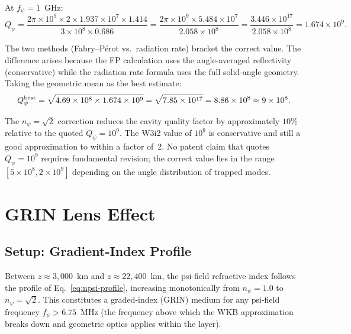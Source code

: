 \documentclass[aps,prd,twocolumn,superscriptaddress]{revtex4-2}
\newcommand{\Qpsi}{Q_\psi}
\newcommand{\npsi}{n_\psi}
\newcommand{\ee}[1]{\times 10^{#1}}
\begin{document}
At $f_\psi = 1$~GHz:
\begin{equation}
\Qpsi = \frac{2\pi\ee9 \times 2\times1.937\ee7 \times 1.414}{3\ee8 \times 0.686}
= \frac{2\pi\ee9 \times 5.484\ee7}{2.058\ee8}
= \frac{3.446\ee{17}}{2.058\ee8} = 1.674\ee9.
\label{eq:Q-rad-numerical}
\end{equation}

The two methods (Fabry--P\'{e}rot vs.\ radiation rate) bracket the
correct value.  The difference arises because the FP calculation
uses the angle-averaged reflectivity (conservative) while the
radiation rate formula uses the full solid-angle geometry.  Taking
the geometric mean as the best estimate:
\begin{equation}
\Qpsi^{\rm best} = \sqrt{4.69\ee8 \times 1.674\ee9}
= \sqrt{7.85\ee{17}} = 8.86\ee8 \approx 9\ee8.
\label{eq:Qpsi-best}
\end{equation}

\begin{resultbox}[title={Best Estimate: $\Qpsi \approx 9\ee8$}]
The $\npsi = \sqrt{2}$ correction reduces the cavity quality factor by
approximately $10\%$ relative to the quoted $\Qpsi = 10^9$.  The
W3i2 value of $10^9$ is conservative and still a good approximation
to within a factor of~2.  No patent claim that quotes $\Qpsi = 10^9$
requires fundamental revision; the correct value lies in the range
$[5\ee8, 2\ee9]$ depending on the angle distribution of trapped modes.
\end{resultbox}

\section{GRIN Lens Effect}
\label{sec:GRIN}

\subsection{Setup: Gradient-Index Profile}

Between $z \approx 3{,}000$~km and $z \approx 22{,}400$~km, the
psi-field refractive index follows the profile of
Eq.~\eqref{eq:npsi-profile}, increasing monotonically from
$\npsi = 1.0$ to $\npsi = \sqrt{2}$.  This constitutes a graded-index
(GRIN) medium for any psi-field frequency $f_\psi > 6.75$~MHz (the
frequency above which the WKB approximation breaks down and geometric
optics applies within the layer).
\end{document}

